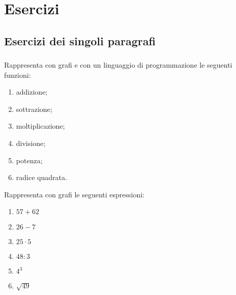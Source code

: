 
\section{Esercizi}

\subsection{Esercizi dei singoli paragrafi}

\subsubsection*{}

\begin{esercizio}
Rappresenta con grafi e con un linguaggio di programmazione le seguenti
funzioni:
\begin{multicols}{3}
 \begin{enumerate}[noitemsep, label=(\alph*)]
 \item addizione; \qquad
 \item sottrazione; \qquad
 \item moltiplicazione; \qquad
 \item divisione; \qquad
 \item potenza; \qquad
 \item radice quadrata.
 \end{enumerate}
\end{multicols}
\end{esercizio}

\begin{esercizio}
Rappresenta con grafi le seguenti espressioni:
\begin{multicols}{3}
 \begin{enumerate}[noitemsep, label=(\alph*)]
 \item \(57 + 62\) \qquad
 \item \(26 - 7\) \qquad
 \item \(25 \cdot 5\) \qquad
 \item \(48 : 3\) \qquad
 \item \(4^3\) \qquad
 \item \(\sqrt{49}\) \qquad
 \end{enumerate}
\end{multicols}
\end{esercizio}

